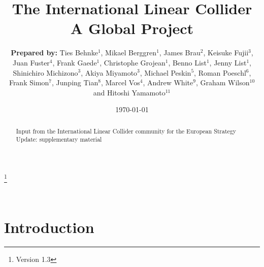\documentclass[%
reprint,
nofootinbib,
 amsmath,amssymb,
 aps,
]{revtex4-1}
\begin{document}

\title{The International Linear Collider \\ A Global Project}%
\thanks{Version 1.3}%

\author{\textbf{Prepared by:}
Ties Behnke$^1$, Mikael Berggren$^1$, James Brau$^2$, Keisuke Fujii$^{3}$, Juan Fuster$^{4}$, Frank Gaede$^{1}$, Christophe Grojean$^{1}$, Benno List$^{1}$, Jenny List$^{1}$, Shinichiro Michizono$^{3}$, Akiya Miyamoto$^{3}$, Michael Peskin$^{5}$, Roman Poeschl$^{6}$, Frank Simon$^{7}$, Junping Tian$^{8}$, Marcel Vos$^{4}$, Andrew White$^{9}$, Graham Wilson$^{10}$ and Hitoshi Yamamoto$^{11}$  }


%


\date{\today}%

\begin{abstract}
Input from the International Linear Collider community for the European Strategy Update: supplementary material

\end{abstract}

 
\maketitle

\tableofcontents

\clearpage
\newpage
\mbox{~}


\section{\label{sec:intro}Introduction}
   
\end{document}
